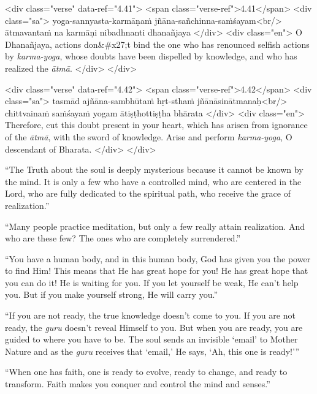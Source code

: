 \begin{html}
<div class="verse" data-ref="4.41">
  <span class="verse-ref">4.41</span>
  <div class="sa">
    yoga-sannyasta-karmāṇaṁ jñāna-sañchinna-saṁśayam<br/>
    ātmavantaṁ na karmāṇi nibadhnanti dhanañjaya
  </div>
  <div class="en">
    O Dhanañjaya, actions don&#x27;t bind the one who has renounced selfish actions by \textit{karma-yoga}, whose doubts have been dispelled by knowledge, and who has realized the \textit{ātmā}.
  </div>
</div>
\end{html}



\begin{html}
<div class="verse" data-ref="4.42">
  <span class="verse-ref">4.42</span>
  <div class="sa">
    tasmād ajñāna-sambhūtaṁ hṛt-sthaṁ jñānāsinātmanaḥ<br/>
    chittvainaṁ saṁśayaṁ yogam ātiṣṭhottiṣṭha bhārata
  </div>
  <div class="en">
    Therefore, cut this doubt present in your heart, which has arisen from ignorance of the \textit{ātmā}, with the sword of knowledge. Arise and perform \textit{karma-yoga}, O descendant of Bharata.
  </div>
</div>
\end{html}


\enquote{The Truth about the soul is deeply mysterious because it cannot be known by the mind. It is only a few who have a controlled mind, who are centered in the Lord, who are fully dedicated to the spiritual path, who receive the grace of realization.}

\enquote{Many people practice meditation, but only a few really attain realization. And who are these few? The ones who are completely surrendered.}

\enquote{You have a human body, and in this human body, God has given you the power to find Him! This means that He has great hope for you! He has great hope that you can do it! He is waiting for you. If you let yourself be weak, He can’t help you. But if you make yourself strong, He will carry you.}

\enquote{If you are not ready, the true knowledge doesn’t come to you. If you are not ready, the \textit{guru} doesn’t reveal Himself to you. But when you are ready, you are guided to where you have to be. The soul sends an invisible \enquote{email} to Mother Nature and as the \textit{guru} receives that \enquote{email,} He says, \enquote{Ah, this one is ready!}}

\enquote{When one has faith, one is ready to evolve, ready to change, and ready to transform. Faith makes you conquer and control the mind and senses.}

